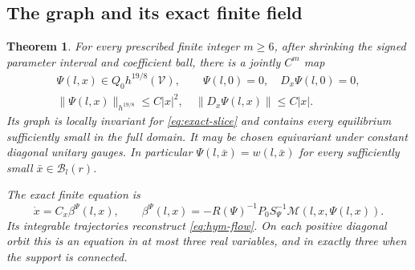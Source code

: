 \documentclass[11pt]{amsart}
\newtheorem{theorem}{Theorem}[section]
\theoremstyle{definition}
\theoremstyle{remark}
\begin{document}
\subsection{The graph and its exact finite field}
\begin{theorem}\label{thm:invariant-graph}
For every prescribed finite integer $m\ge6$, after shrinking the
signed parameter interval and coefficient ball, there is a jointly
$C^m$ map
\begin{equation}\label{eq:graph-bounds}
 \begin{gathered}
 \Psi(l,x)\in Q_0h^{19/8}(\mathcal V),\qquad
 \Psi(l,0)=0,\quad D_x\Psi(l,0)=0,\\
 \|\Psi(l,x)\|_{h^{19/8}}\le C|x|^2,\quad
 \|D_x\Psi(l,x)\|\le C|x|.
 \end{gathered}
\end{equation}
Its graph is locally invariant for \eqref{eq:exact-slice} and
contains every equilibrium sufficiently small in the full domain.
It may be chosen equivariant under constant diagonal unitary gauges.
In particular $\Psi(l,\bar x)=w(l,\bar x)$ for every sufficiently
small $\bar x\in\mathcal B_l(r)$.

The exact finite equation is
\begin{equation}\label{eq:finite-field}
 \dot x=C_x\beta^\Psi(l,x),\qquad
 \beta^\Psi(l,x)=
 -R(\Psi)^{-1}P_0S_\Psi^{-1}\mathcal M(l,x,\Psi(l,x)).
\end{equation}
Its integrable trajectories reconstruct \eqref{eq:hym-flow}.
On each positive diagonal orbit this is an equation in at most
three real variables, and in exactly three when the support is connected.
\end{theorem}
\end{document}
